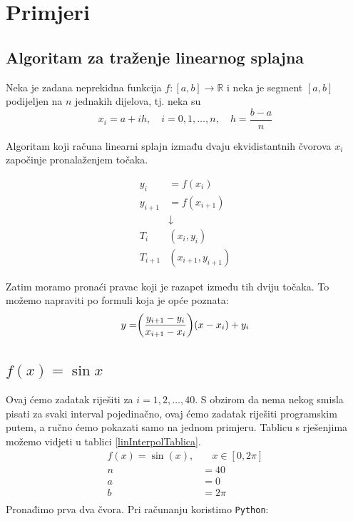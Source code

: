 \documentclass[12pt,a4paper]{report}
\begin{document}
	\section{Primjeri}
		\subsection{Algoritam za traženje linearnog splajna}
		Neka je zadana neprekidna funkcija $f:[a,b]\rightarrow \mathbb{R} $ i neka je segment $[a,b]$ podijeljen na $n$ jednakih dijelova, tj. neka su
		\begin{equation*}
			x_i=a+ih,\quad i=0,1,\ldots,n,\quad h=\frac{b-a}{n}
		\end{equation*}
		
		Algoritam koji računa linearni splajn izmađu dvaju ekvidistantnih čvorova $x_i$ započinje pronalaženjem točaka.
		
		\begin{align*}
			y_i&=f(x_i)\\
			y_{i+1}&=f(x_{i+1})\\
			&\downarrow\\
			T_i&(x_i, y_i)\\
			T_{i+1}&(x_{i+1}, y_{i+1})
		\end{align*}
		
		Zatim moramo pronaći pravac koji je razapet između tih dviju točaka. To možemo napraviti po formuli koja je opće poznata:
		\begin{equation}
		y=\biggr{(}\frac{y_{i+1}-y_i}{x_{i+1}-x_i}\biggr{)}(x-x_i)+y_i
		\label{pravac}
		\end{equation}
		
		
		\subsection{$f(x)=\sin x$}
		Ovaj ćemo zadatak riješiti za $i=1, 2,\ldots, 40$. S obzirom da nema nekog smisla pisati za svaki interval pojedinačno, ovaj ćemo zadatak riješiti programskim putem, a ručno ćemo pokazati samo na jednom primjeru. Tablicu s rješenjima možemo vidjeti u tablici \ref{linInterpolTablica}.
		\begin{align*}
			f(x)=\sin (x),& \quad x\in [0, 2\pi]\\
			n&=40\\
			a&=0\\
			b&=2\pi\\
		\end{align*}
		Pronađimo prva dva čvora. Pri računanju koristimo \texttt{Python}:
\end{document}
